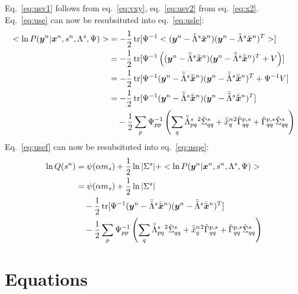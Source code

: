\documentclass[a4paper]{article}
\begin{document}
Eq.~\ref{eq:usv1} follows from eq.~\ref{eq:vxy}, eq.~\ref{eq:usv2} from eq.~\ref{eq:x2}. \\
Eq.~\ref{eq:use} can now be resubsituted into eq.~\ref{eq:usle}:
\begin{align}
  <\ln P(\Xy|\Xx,\Xs,\Xl,\Psi)>
  &=-\frac{1}{2}\Xtr[\Xpsii <(\Xy-\Xlt\Xxt)(\Xy-\Xlt\Xxt)^T>] \\
  &=-\frac{1}{2}\Xtr[\Xpsii \left((\Xy-\Xltm\Xxtm)(\Xy-\Xltm\Xxtm)^T+V\right)] \\
  &=-\frac{1}{2}\Xtr[\Xpsii(\Xy-\Xltm\Xxtm)(\Xy-\Xltm\Xxtm)^T + \Xpsii V] \\
  &=-\frac{1}{2}\Xtr[\Xpsii(\Xy-\Xltm\Xxtm)(\Xy-\Xltm\Xxtm)^T] \nonumber \\
  &\quad-\frac{1}{2}\sum_p\Xpsii_{pp}\left(\sum_q\Xltmpq{}^2\Xxtv_{qq}+\Xxtmq{}^2\Xltvp_{qq}+\Xltvp_{qq}\Xxtv_{qq}\right) \label{eq:usef}
\end{align}
Eq.~\ref{eq:usef} can now be resubsituted into eq.~\ref{eq:usqe}:
\begin{align}
  \ln Q(\Xs)
  &=\psi(\alpha m_s)+\frac{1}{2}\ln |\Xxs|+<\ln P(\Xy|\Xx,\Xs,\Xl,\Psi)> \\
  &=\psi(\alpha m_s)+\frac{1}{2}\ln |\Xxs| \nonumber \\
  &\quad-\frac{1}{2}\Xtr[\Xpsii(\Xy-\Xltm\Xxtm)(\Xy-\Xltm\Xxtm)^T] \nonumber \\
  &\quad-\frac{1}{2}\sum_p\Xpsii_{pp}\left(\sum_q\Xltmpq{}^2\Xxtv_{qq}+\Xxtmq{}^2\Xltvp_{qq}+\Xltvp_{qq}\Xxtv_{qq}\right)
\end{align}

\section{Equations}
\newcommand{\Xvx}{\bs{x}}
\newcommand{\Xvy}{\bs{y}}
\end{document}
